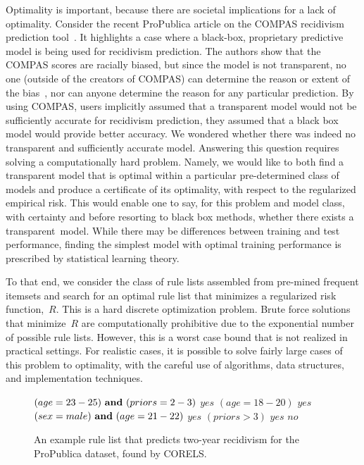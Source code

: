 Optimality is important, because there are societal implications for a lack of optimality.
%
Consider the recent ProPublica article on the COMPAS recidivism prediction tool~\citep{LarsonMaKiAn16}.
%
It highlights a case where a black-box, proprietary predictive model is being used for recidivism prediction.
%
The authors show that the COMPAS scores are racially biased, but since the model is not transparent, no one (outside of the creators of COMPAS) can determine the reason or extent of the bias~\citep{LarsonMaKiAn16}, nor can anyone determine the reason for any particular prediction.
%
By using COMPAS, users implicitly assumed that a transparent model
would not be sufficiently accurate for recidivism prediction,
\ie they assumed that a black box model would provide better accuracy.
%
We wondered whether there was indeed no transparent and sufficiently accurate model.
%
Answering this question requires solving a computationally hard problem.
%
Namely, we would like to both find a transparent model that is optimal
within a particular pre-determined class of models
and produce a certificate of its optimality, with respect to the regularized empirical risk.
%
This would enable one to say, for this problem and model class,
with certainty and before resorting to black box methods,
whether there exists a transparent~model.
%
While there may be differences between training and test performance,
finding the simplest model with optimal training performance is prescribed by
statistical learning theory.

To that end, we consider the class of rule lists assembled from pre-mined frequent itemsets
and search for an optimal rule list that minimizes a regularized risk function,~$R$.
%
This is a hard discrete optimization problem.
%
Brute force solutions that minimize~$R$ are computationally prohibitive
due to the exponential number of possible rule lists.
%
However, this is a worst case bound that is not realized in practical settings.
%
For realistic cases, it is possible to solve fairly large cases of this problem to optimality,
with the careful use of algorithms, data structures, and implementation techniques.

\begin{kdd}
\begin{figure}[b!]
\vspace{-3mm}
\begin{algorithmic}
\normalsize
\State \bif $(age=23-25) {\bf ~and~} (priors=2-3)$ \bthen $yes$
\State \belif $(age=18-20)$ \bthen $yes$
\State \belif $(sex=male) {\bf ~and~} (age=21-22)$ \bthen $yes$
\State \belif $(priors>3)$ \bthen $yes$
\State \belse $no$
\end{algorithmic}
\vspace{-3mm}
\caption{An example rule list that predicts two-year recidivism
for the ProPublica dataset, found by CORELS.
}
\label{fig:rule-list}
\end{figure}
\end{kdd}

